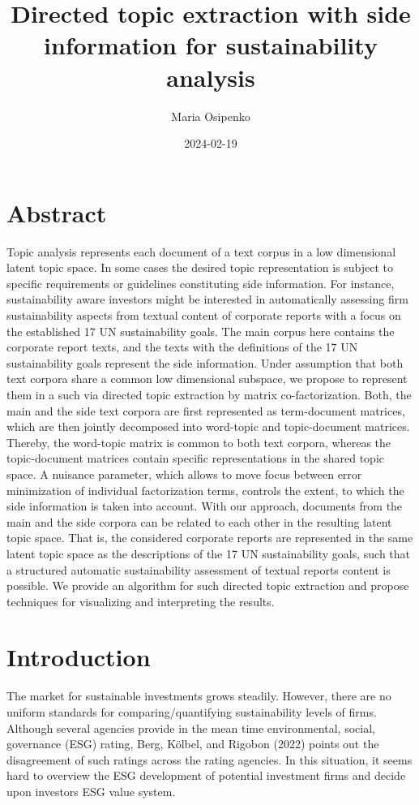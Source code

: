\documentclass[
]{article}
\title{Directed topic extraction with side information for sustainability analysis}
\author{Maria Osipenko}
\date{2024-02-19}
\begin{document}
\maketitle

\hypertarget{abstract}{%
\section{Abstract}\label{abstract}}

Topic analysis represents each document of a text corpus in a low dimensional latent topic space. In some cases the desired topic representation is subject to specific requirements or guidelines constituting side information. For instance, sustainability aware investors might be interested in automatically assessing firm sustainability aspects from textual content of corporate reports with a focus on the established 17 UN sustainability goals. The main corpus here contains the corporate report texts, and the texts with the definitions of the 17 UN sustainability goals represent the side information. Under assumption that both text corpora share a common low dimensional subspace, we propose to represent them in a such via directed topic extraction by matrix co-factorization. Both, the main and the side text corpora are first represented as term-document matrices, which are then jointly decomposed into word-topic and topic-document matrices. Thereby, the word-topic matrix is common to both text corpora, whereas the topic-document matrices contain specific representations in the shared topic space. A nuisance parameter, which allows to move focus between error minimization of individual factorization terms, controls the extent, to which the side information is taken into account. With our approach, documents from the main and the side corpora can be related to each other in the resulting latent topic space. That is, the considered corporate reports are represented in the same latent topic space as the descriptions of the 17 UN sustainability goals, such that a structured automatic sustainability assessment of textual reports content is possible. We provide an algorithm for such directed topic extraction and propose techniques for visualizing and interpreting the results.

\hypertarget{introduction}{%
\section{Introduction}\label{introduction}}

The market for sustainable investments grows steadily. However, there are no uniform standards for comparing/quantifying sustainability levels of firms. Although several agencies provide in the mean time environmental, social, governance (ESG) rating, Berg, Kölbel, and Rigobon (2022) points out the disagreement of such ratings across the rating agencies. In this situation, it seems hard to overview the ESG development of potential investment firms and decide upon investors ESG value system.
\end{document}
